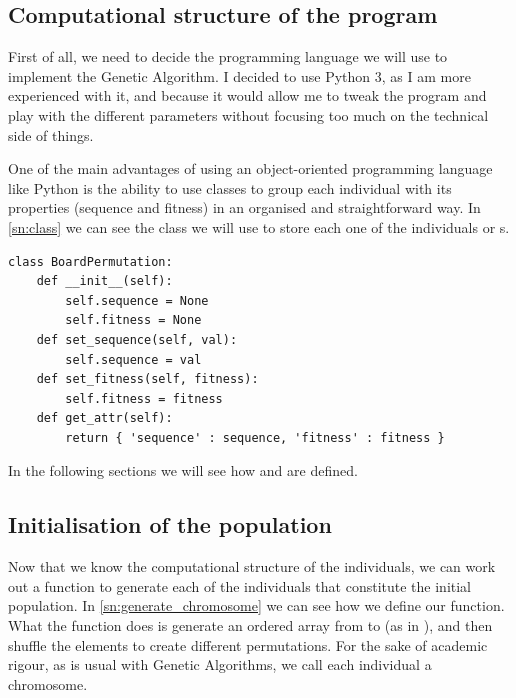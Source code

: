 \subsection{Computational structure of the program}\label{sec:program}
First of all, we need to decide the programming language we will use to implement the Genetic Algorithm. I decided to use Python 3, as I am more experienced with it, and because it would allow me to tweak the program and play with the different parameters without focusing too much on the technical side of things.

One of the main advantages of using an object-oriented programming language like Python is the ability to use classes to group each individual with its properties (sequence and fitness) in an organised and straightforward way. In \cref{sn:class} we can see the  class we will use to store each one of the individuals or s.

\begin{lstlisting}[label=sn:class, caption=Definition of the \inline{BoardPermutation} class]
class BoardPermutation:
	def __init__(self):
		self.sequence = None
		self.fitness = None
	def set_sequence(self, val):
		self.sequence = val
	def set_fitness(self, fitness):
		self.fitness = fitness
	def get_attr(self):
		return { 'sequence' : sequence, 'fitness' : fitness }
\end{lstlisting}

In the following sections we will see how  and  are defined.

\subsection{Initialisation of the population}\label{sec:init}

Now that we know the computational structure of the individuals, we can work out a function to generate each of the individuals that constitute the initial population. In \cref{sn:generate_chromosome} we can see how we define our  function. What the function does is generate an ordered array from  to  (as in \inline{[0 1 2 3 ... N_QUEENS]}), and then shuffle the elements to create different permutations. For the sake of academic rigour, as is usual with Genetic Algorithms, we call each individual a chromosome.


